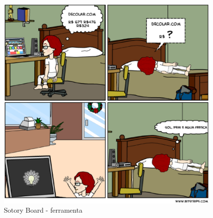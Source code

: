 \begin{figure}[h]
	\centering
	\label{fig02}
		\includegraphics[keepaspectratio=true,scale=0.5]{figuras/ferramenta.eps}
		\caption{Sotory Board - ferramenta}
\end{figure}

